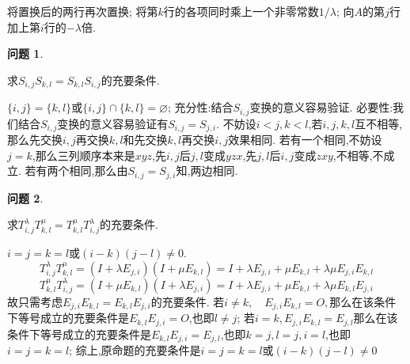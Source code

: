 \documentclass[11pt]{ctexart}
\theoremstyle{definition}
\newtheorem{qqq}{问题}[section]
\numberwithin{equation}{section}
\begin{document}
\begin{aaa}
    将置换后的两行再次置换;\newline
    将第$k$行的各项同时乘上一个非零常数$1/\lambda$;\newline
    向$A$的第$j$行加上第$i$行的$-\lambda$倍.
\end{aaa}
\begin{qqq}
    \begin{pinked}
        求$S_{i,j}S_{k,l}=S_{k,l}S_{i,j}$的充要条件.
    \end{pinked}
        
\end{qqq}
\begin{aaa}
    $\{i,j\}=\{k,l\}$或$\{i,j\}\cap \{k,l\}=\varnothing $;\newline
    充分性:结合$S_{i,j}$变换的意义容易验证.\newline
    必要性:我们结合$S_{i,j}$变换的意义容易验证有$S_{i,j}=S_{j,i}$.\newline
    不妨设$i<j,k<l$,若$i,j,k,l$互不相等,那么先交换$i,j$再交换$k,l$和先交换$k,l$再交换$i,j$效果相同.\newline
    若有一个相同,不妨设$j=k$,那么三列顺序本来是$xyz$,先$i,j$后$j,l$变成$yzx$,先$j,l$后$i,j$变成$zxy$,不相等,不成立.\newline
    若有两个相同,那么由$S_{i,j}=S_{j,i}$知,两边相同.
\end{aaa}
\begin{qqq}
    \begin{pinked}
        求$T^\lambda _{i,j}T^\mu _{k,l}=T^\mu _{k,l}T^\lambda _{i,j}$的充要条件.
    \end{pinked}
    
\end{qqq}
\begin{aaa}
    $i=j=k=l$或$(i-k)(j-l)\neq 0$.
    $$T^\lambda _{i,j}T^\mu _{k,l}=(I+\lambda E_{j,i})(I+\mu E_{k,l})=I+\lambda E_{j,i}+\mu E_{k,l}+\lambda\mu E_{j,i}E_{k,l}$$
    $$T^\mu _{k,l}T^\lambda _{i,j}=(I+\mu E_{k,l})(I+\lambda E_{j,i})=I+\lambda E_{j,i}+\mu E_{k,l}+\lambda\mu E_{k,l}E_{j,i}$$
    故只需考虑$E_{j,i}E_{k,l}=E_{k,l}E_{j,i}$的充要条件.\newline
    若$i \neq k,\quad E_{j,i}E_{k,l}=O,$那么在该条件下等号成立的充要条件是$E_{k,l}E_{j,i}=O$,也即$l \neq j$;\newline
    若$i=k,E_{j,i}E_{k,l}=E_{j,l}$那么在该条件下等号成立的充要条件是$E_{k,l}E_{j,i}=E_{j,l}$,也即$k=j,l=j,i=l$,也即$i=j=k=l$;\newline
    综上,原命题的充要条件是$i=j=k=l$或$(i-k)(j-l)\neq 0$
\end{aaa}
\end{document}
